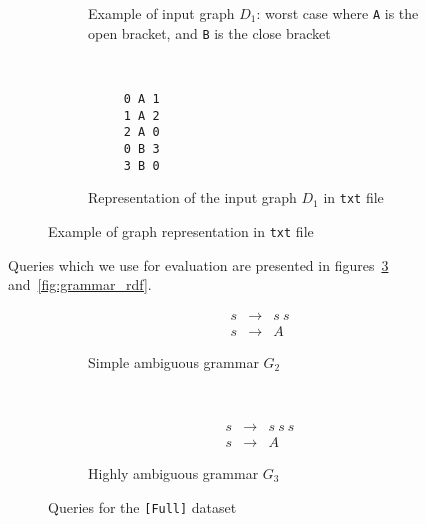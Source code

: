 \begin{figure}[h]
    \centering
    \begin{subfigure}[b]{0.25\textwidth}
        \centering

        \caption{Example of input graph $D_1$: worst case where \texttt{A} is the open bracket, and \texttt{B} is the close bracket}
        \label{fig:worstCaseGraph}
    \end{subfigure}%
    ~
    \begin{subfigure}[b]{0.20\textwidth}
        \centering
         \begin{verbatim}
     0 A 1
     1 A 2
     2 A 0
     0 B 3
     3 B 0
 \end{verbatim}

        \caption{Representation of the input graph $D_1$ in \texttt{txt} file}
    \end{subfigure}
    \caption{Example of graph representation in \texttt{txt} file}
    \label{fig:graph_example}
\end{figure}

Queries which we use for evaluation are presented in figures~\ref{fig:grammar_full} and~\ref{fig:grammar_rdf}.


\begin{figure}[h]
    \centering
    \begin{subfigure}[b]{0.24\textwidth}
        \centering
        \[
         \begin{array}{rcl}
           s & \rightarrow & s \ s \\
           s & \rightarrow & A
         \end{array}
         \]
        \caption{Simple ambiguous grammar $G_2$}
    \end{subfigure}%
    ~
    \begin{subfigure}[b]{0.24\textwidth}
        \centering
        \[
         \begin{array}{rcl}
           s & \rightarrow & s \ s \ s \\
           s & \rightarrow & A
         \end{array}
         \]
        \caption{Highly ambiguous grammar $G_3$}
    \end{subfigure}
    \caption{Queries for the \texttt{[Full]} dataset}
    \label{fig:grammar_full}
\end{figure}

